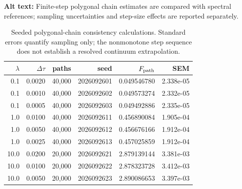 \begin{table}[ht]
\centering
\caption{Seeded polygonal-chain consistency calculations.  Standard errors quantify sampling only; the nonmonotone step sequence does not establish a resolved continuum extrapolation.}
\par\raggedright\textbf{Alt text:} Finite-step polygonal chain estimates are compared with spectral references; sampling uncertainties and step-size effects are reported separately.\par\centering

\label{tab:path_validation}
\begin{tabular}{rrrrrr}
\toprule
$\lambda$ & $\Delta\tau$ & paths & seed & $F_{\rm path}$ & SEM\\
\midrule
0.1 & 0.0020 & 40,000 & 2026092601 & 0.049546780 & 2.338e-05\\
0.1 & 0.0010 & 40,000 & 2026092602 & 0.049573274 & 2.332e-05\\
0.1 & 0.0005 & 40,000 & 2026092603 & 0.049492886 & 2.335e-05\\
1.0 & 0.0100 & 40,000 & 2026092611 & 0.456890084 & 1.905e-04\\
1.0 & 0.0050 & 40,000 & 2026092612 & 0.456676166 & 1.912e-04\\
1.0 & 0.0025 & 40,000 & 2026092613 & 0.457025859 & 1.912e-04\\
10.0 & 0.0200 & 20,000 & 2026092621 & 2.879139144 & 3.381e-03\\
10.0 & 0.0100 & 20,000 & 2026092622 & 2.878323728 & 3.412e-03\\
10.0 & 0.0050 & 20,000 & 2026092623 & 2.890086653 & 3.397e-03\\
\bottomrule
\end{tabular}
\end{table}
